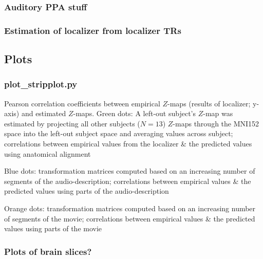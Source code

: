 \subsubsection{Auditory PPA stuff}



\subsubsection{Estimation of localizer from localizer TRs}




\subsection{Plots}

\subsubsection{plot\_stripplot.py}

%
Pearson correlation coefficients between empirical $Z$-maps (results of
localizer; y-axis) and estimated $Z$-maps.
%
Green dots: A left-out subject's $Z$-map was estimated by projecting all other
subjects ($N = 13$) $Z$-maps through the MNI152 space into the left-out subject
space and averaging values across subject; correlations between empirical values
from the localizer \& the predicted values using anatomical alignment

%
Blue dots: transformation matrices computed based on an increasing number of
segments of the audio-description; correlations between empirical values \& the
predicted values using parts of the audio-description

%
Orange dots: transformation matrices computed based on an increasing number of
segments of the movie; correlations between empirical values \& the predicted
values using parts of the movie


\subsubsection{Plots of brain slices?}



